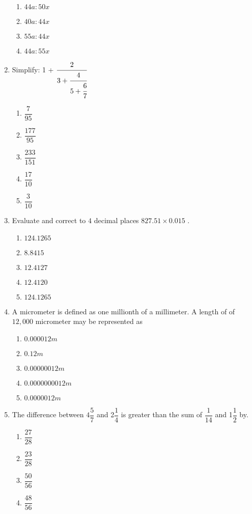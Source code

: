 \begin{multicols}{2}
\begin{enumerate}[label={\arabic*.}]
\begin{enumerate}[label={\Alph*.}]
    \item \(44a:50x\)
    \item \(40a:44x\)
    \item \(55a:44x\)
    \item \(44a:55x\)
    \end{enumerate}
\item Simplify: 1 + \(\cfrac{2}{3 + \cfrac{4}{5+ \cfrac{6}{7}}}\)
    \begin{enumerate}[label={\Alph*.}]
    \item \(\dfrac{7}{95}\)
    \item \(\dfrac{177}{95}\)
    \item \(\dfrac{233}{151}\)
    \item \(\dfrac{17}{10}\)
    \item \(\dfrac{3}{10}\)
    \end{enumerate}
\item Evaluate and correct to \(4\) decimal places  \(827.51 \times 0.015\) .
    \begin{enumerate}[label={\Alph*.}]
    \item \(124.1265\)
    \item \(8.8415\)
    \item \(12.4127\)
    \item \(12.4120\)
    \item \(124.1265\)
    \end{enumerate}
\item A micrometer is defined as one millionth of a millimeter. A length of of \(12,000\) micrometer may be represented as
    \begin{enumerate}[label={\Alph*.}]
    \item \(0.000012m\)
    \item \(0.12m\)
    \item \(0.00000012m\)
    \item \(0.0000000012m\)
    \item \(0.0000012m\)
    \end{enumerate}
\item The difference between \(4{\dfrac{5}{7}}\) and 2\(\dfrac{1}{4}\) is greater than the sum of \(\dfrac{1}{14}\) and 1\(\dfrac{1}{2}\) by.
    \begin{enumerate}[label={\Alph*.}]
    \item \(\dfrac{27}{28}\)
    \item \(\dfrac{23}{28}\)
    \item \(\dfrac{50}{56}\)
    \item \(\dfrac{48}{56}\)

\end{enumerate}
\end{enumerate}
\end{multicols}
